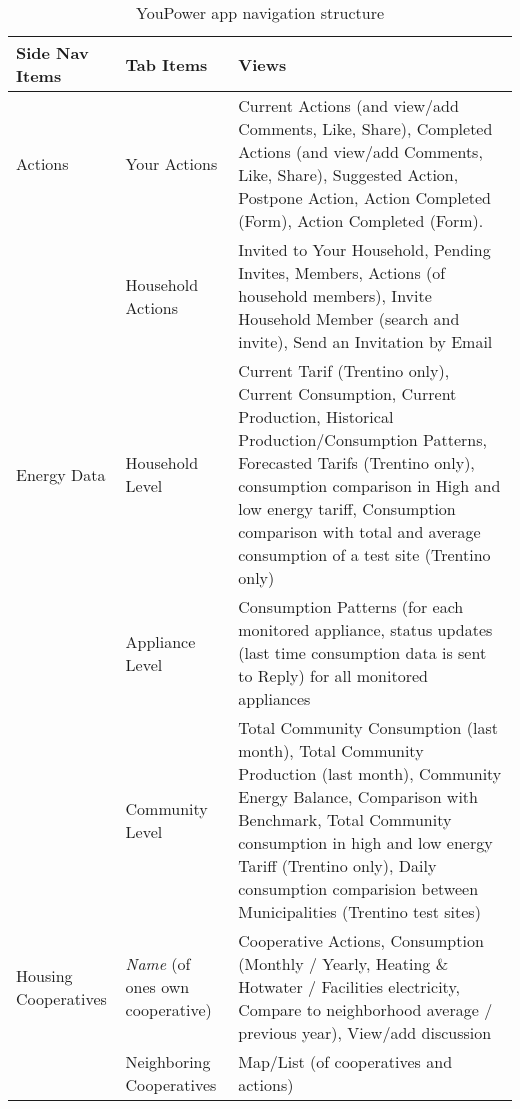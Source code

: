 {
\footnotesize 
\begin{longtable}{ p{4cm}  p{4cm} p{6.5cm}}
\caption{YouPower app navigation structure}\label{tab:app_nav}\\
\hline
\textbf{Side Nav Items}  &
\textbf{Tab Items}  &
\textbf{Views}  \\ \hline

Actions & Your Actions & Current Actions (and view/add Comments, Like, Share), Completed Actions (and view/add Comments, Like, Share), Suggested Action, Postpone Action, Action Completed (Form), Action Completed (Form).\\ \cline{2-3}
& Household Actions & Invited to Your Household, Pending Invites, Members, Actions (of household members), Invite Household Member (search and invite), Send an Invitation by Email \\ 
\hline

Energy Data  & Household Level  & Current Tarif (Trentino only), Current Consumption, Current Production, Historical Production/Consumption Patterns, Forecasted Tarifs (Trentino only), consumption comparison in High and low energy tariff, Consumption comparison with total and average consumption of a test site (Trentino only) \\  \cline{2-3}
& Appliance Level & Consumption Patterns (for each monitored appliance, status updates (last time consumption data is sent to Reply) for all monitored appliances\\  \cline{2-3}
&  Community Level & Total Community Consumption (last month), Total Community Production (last month), Community Energy Balance, Comparison with Benchmark, Total Community consumption in high and low energy Tariff (Trentino only), Daily consumption comparision between Municipalities (Trentino test sites)\\  \hline

Housing Cooperatives & \textit{Name} (of ones own cooperative) & Cooperative Actions, Consumption (Monthly / Yearly, Heating \& Hotwater / Facilities electricity, Compare to neighborhood average / previous year), View/add discussion \\ \cline{2-3}
& Neighboring Cooperatives &  Map/List (of cooperatives and actions) \\  \hline



\end{longtable}}
